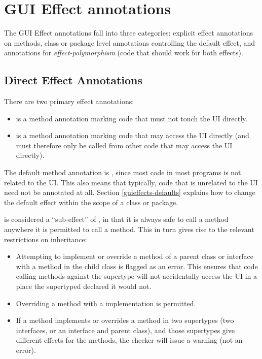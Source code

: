 \section{GUI Effect annotations\label{guieffects-annotations}}
The GUI Effect annotations fall into three categories: explicit effect annotations on methods, class
or package level annotations controlling the default effect, and annotations for
\emph{effect-polymorphism} (code that should work for both effects).

\subsection{Direct Effect Annotations}
There are two primary effect annotations:
\begin{itemize}
\item {} is a method annotation marking code that must not touch the UI directly.
\item {} is a method annotation marking code that may access the UI directly (and must
therefore only be called from other code that may access the UI directly).
\end{itemize}

The default method annotation is , since most code in most programs is not related
to the UI.  This also means that typically, code that is unrelated to the UI need not be annotated
at all.  Section \ref{guieffects-defaults} explains how to change the default effect within the
scope of a class or package.

 is considered a ``sub-effect'' of , in that it is always safe to
call a  method anywhere it is permitted to call a  method.  This
in turn gives rise to the relevant restrictions on inheritance:
\begin{itemize}
\item Attempting to implement or override a  method of a parent class or interface
with a  method in the child class is flagged as an error.  This ensures that
code calling methods against the supertype will not accidentally access the UI in a place the
supertyped declared it would not.
\item Overriding a  method with a  implementation is permitted.
\item If a method implements or overrides a method in two supertypes (two interfaces, or an
interface and parent class), and those supertypes give different effects for the methods, the
checker will issue a warning (not an error).
\end{itemize}


